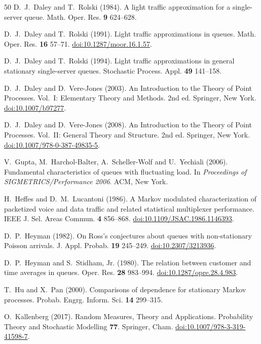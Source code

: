 \documentclass[aap,preprint]{imsart}
\numberwithin{equation}{section}
\theoremstyle{plain}
\theoremstyle{definition}
\newcommand{\1}{\mathbf 1}
\begin{document}
\begin{thebibliography}{50}
D.~J.~Daley and T.~Rolski (1984).
A light traffic approximation for a single-server queue.
Math. Oper. Res. \textbf{9} 624--628.

D.~J.~Daley and T.~Rolski (1991).
Light traffic approximations in queues.
Math. Oper. Res. \textbf{16} 57--71.
\href{https://doi.org/10.1287/moor.16.1.57}{doi:10.1287/moor.16.1.57}.

D.~J.~Daley and T.~Rolski (1994).
Light traffic approximations in general stationary single-server queues.
Stochastic Process. Appl. \textbf{49} 141--158.

D.~J.~Daley and D.~Vere-Jones (2003).
An Introduction to the Theory of Point Processes. Vol.~I: Elementary Theory and Methods.
2nd ed. Springer, New York.
\href{https://doi.org/10.1007/b97277}{doi:10.1007/b97277}.

D.~J.~Daley and D.~Vere-Jones (2008).
An Introduction to the Theory of Point Processes. Vol.~II: General Theory and Structure.
2nd ed. Springer, New York.
\href{https://doi.org/10.1007/978-0-387-49835-5}{doi:10.1007/978-0-387-49835-5}.

V.~Gupta, M.~Harchol-Balter, A.~Scheller-Wolf and U.~Yechiali (2006).
Fundamental characteristics of queues with fluctuating load.
In \emph{Proceedings of SIGMETRICS/Performance 2006}. ACM, New York.

H.~Heffes and D.~M.~Lucantoni (1986).
A Markov modulated characterization of packetized voice and data traffic and related statistical multiplexer performance.
IEEE J. Sel. Areas Commun. \textbf{4} 856--868.
\href{https://doi.org/10.1109/JSAC.1986.1146393}{doi:10.1109/JSAC.1986.1146393}.

D.~P.~Heyman (1982).
On Ross's conjectures about queues with non-stationary Poisson arrivals.
J. Appl. Probab. \textbf{19} 245--249.
\href{https://doi.org/10.2307/3213936}{doi:10.2307/3213936}.

D.~P.~Heyman and S.~Stidham, Jr. (1980).
The relation between customer and time averages in queues.
Oper. Res. \textbf{28} 983--994.
\href{https://doi.org/10.1287/opre.28.4.983}{doi:10.1287/opre.28.4.983}.

T.~Hu and X.~Pan (2000).
Comparisons of dependence for stationary Markov processes.
Probab. Engrg. Inform. Sci. \textbf{14} 299--315.

O.~Kallenberg (2017).
Random Measures, Theory and Applications.
Probability Theory and Stochastic Modelling \textbf{77}. Springer, Cham.
\href{https://doi.org/10.1007/978-3-319-41598-7}{doi:10.1007/978-3-319-41598-7}.


\end{thebibliography}
\end{document}
